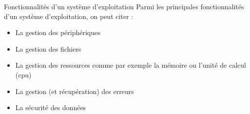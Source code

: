 \documentclass[10pt]{beamer}
\begin{document}
\begin{frame}
	\mframe{\Systeme}
	\begin{block}{Fonctionnalités d'un système d'exploitation}
		Parmi les principales fonctionnalités d'un système d'exploitation, on peut citer :
		\begin{itemize}
			\item<2-> La gestion des périphériques
			\item<3-> La gestion des fichiers
			\item<4-> La gestion des ressources comme par exemple la mémoire ou l'unité de calcul ({\sc cpu})
			\item<5-> La gestion (et récupération) des erreurs
			\item<6-> La sécurité des données
		\end{itemize}
	\end{block}
\end{frame}
\end{document}
